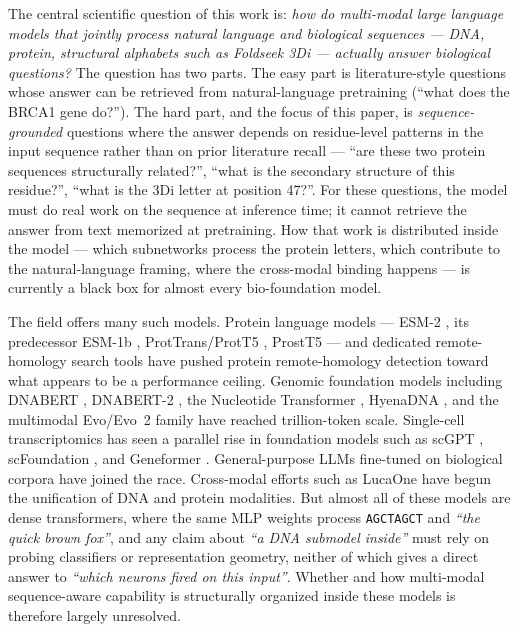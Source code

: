 \documentclass[11pt]{article}
\begin{document}
The central scientific question of this work is: \emph{how do multi-modal large language models that jointly process natural language and biological sequences --- DNA, protein, structural alphabets such as Foldseek 3Di --- actually answer biological questions?} The question has two parts. The easy part is literature-style questions whose answer can be retrieved from natural-language pretraining (``what does the BRCA1 gene do?''). The hard part, and the focus of this paper, is \emph{sequence-grounded} questions where the answer depends on residue-level patterns in the input sequence rather than on prior literature recall --- ``are these two protein sequences structurally related?'', ``what is the secondary structure of this residue?'', ``what is the 3Di letter at position 47?''. For these questions, the model must do real work on the sequence at inference time; it cannot retrieve the answer from text memorized at pretraining. How that work is distributed inside the model --- which subnetworks process the protein letters, which contribute to the natural-language framing, where the cross-modal binding happens --- is currently a black box for almost every bio-foundation model.

The field offers many such models. Protein language models --- ESM-2 \citep{lin2023evolutionary}, its predecessor ESM-1b \citep{rives2021biological}, ProtTrans/ProtT5 \citep{elnaggar2021prottrans}, ProstT5 \citep{heinzinger2024prostt5} --- and dedicated remote-homology search tools \citep{hamamsy2024protein, liu2024plmsearch, schutze2023prottranssearch} have pushed protein remote-homology detection toward what appears to be a performance ceiling. Genomic foundation models including DNABERT \citep{ji2021dnabert}, DNABERT-2 \citep{zhou2023dnabert2}, the Nucleotide Transformer \citep{dallatorre2023nucleotide}, HyenaDNA \citep{nguyen2023hyenadna}, and the multimodal Evo/Evo~2 family \citep{nguyen2024evo, brixi2026evo2} have reached trillion-token scale. Single-cell transcriptomics has seen a parallel rise in foundation models such as scGPT \citep{cui2024scgpt}, scFoundation \citep{hao2024scfoundation}, and Geneformer \citep{theodoris2023geneformer}. General-purpose LLMs fine-tuned on biological corpora \citep{wang2026biopaws, luo2022biogpt, bolton2024biomedlm, gu2021pubmedbert} have joined the race. Cross-modal efforts such as LucaOne \citep{he2024lucaone} have begun the unification of DNA and protein modalities. But almost all of these models are dense transformers, where the same MLP weights process \texttt{AGCTAGCT} and \emph{``the quick brown fox''}, and any claim about \emph{``a DNA submodel inside''} must rely on probing classifiers or representation geometry, neither of which gives a direct answer to \emph{``which neurons fired on this input''}. Whether and how multi-modal sequence-aware capability is structurally organized inside these models is therefore largely unresolved.
\end{document}
